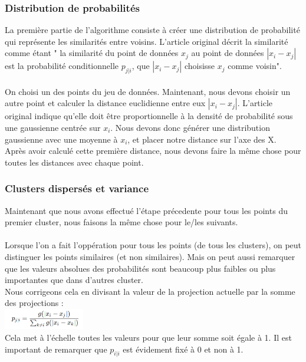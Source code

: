             \subsubsection*{Distribution de probabilités}
            La première partie de l'algorithme consiste à créer une distribution de probabilité qui représente les similarités entre voisins. L'article original décrit la similarité comme étant " la similarité du point de données $x_j$ au point de données $|x_i-x_j|$ est la probabilité conditionnelle $p_{j|i}$, que $|x_i-x_j|$ choisisse $x_j$ comme voisin".
            \\
            \\
            On choisi un des points du jeu de données. Maintenant, nous devons choisir un autre point et calculer la distance euclidienne entre eux $|x_i-x_j|$. L'article original indique qu'elle doit être proportionnelle à la densité de probabilité sous une gaussienne centrée sur $x_i$. Nous devons donc générer une distribution gaussienne avec une moyenne à $x_i$, et placer notre distance sur l'axe des X. 
            \\
            Après avoir calculé cette première distance, nous devons faire la même chose pour toutes les distances avec chaque point. 

                

            \subsubsection*{Clusters dispersés et variance}
            Maintenant que nous avons effectué l'étape précedente pour tous les points du premier cluster, nous faisons la même chose pour le/les suivants.
            \\
            \\
            Lorsque l'on a fait l'oppération pour tous les points (de tous les clusters), on peut distinguer les points similaires (et non similaires). Mais on peut aussi remarquer que les valeurs absolues des probabilités sont beaucoup plus faibles ou plus importantes que dans d'autres cluster.
            \\
            Nous corrigeons cela en divisant la valeur de la projection actuelle par la somme des projections : 
            \\
            \includegraphics[width=100pt]{./img/reduction_dim/t_sne/eq_prob_1.png}
            \\
            Cela met à l'échelle toutes les valeurs pour que leur somme soit égale à 1. Il est important de remarquer que $p_{i|i}$ est évidement fixé à 0 et non à 1.

